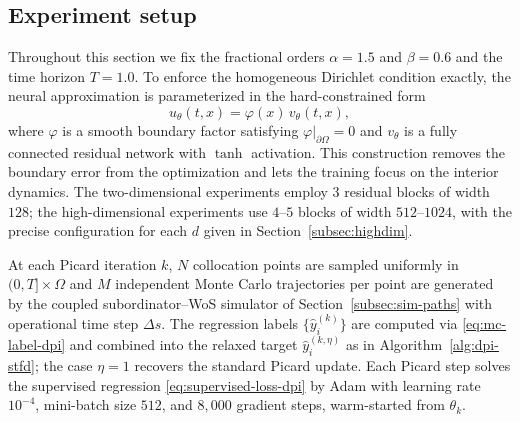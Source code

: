 \documentclass[a4paper,fleqn]{cas-sc}
\begin{document}
\subsection{Experiment setup}\label{subsec:setup}

Throughout this section we fix the fractional orders $\alpha=1.5$ and $\beta=0.6$
and the time horizon $T=1.0$. To enforce the homogeneous Dirichlet condition
exactly, the neural approximation is parameterized in the hard-constrained
form
\begin{equation}\label{eq:hard-constraint}
u_\theta(t,x)=\varphi(x)\,v_\theta(t,x),
\end{equation}
where $\varphi$ is a smooth boundary factor satisfying $\varphi|_{\partial\Omega}=0$
and $v_\theta$ is a fully connected residual network with $\tanh$ activation.
This construction removes the boundary error from the optimization and lets the
training focus on the interior dynamics. The two-dimensional experiments
employ $3$ residual blocks of width $128$; the high-dimensional experiments
use $4$--$5$ blocks of width $512$--$1024$, with the precise configuration for
each $d$ given in Section~\ref{subsec:highdim}.

At each Picard iteration $k$, $N$ collocation points are sampled uniformly in
$(0,T]\times\Omega$ and $M$ independent Monte Carlo trajectories per point are
generated by the coupled subordinator--WoS simulator of
Section~\ref{subsec:sim-paths} with operational time step $\Delta s$. The
regression labels $\{\widehat{y}_i^{(k)}\}$ are computed via
\eqref{eq:mc-label-dpi} and combined into the relaxed target
$\widehat{y}_i^{(k,\eta)}$ as in Algorithm~\ref{alg:dpi-stfd}; the case
$\eta=1$ recovers the standard Picard update. Each Picard step solves the
supervised regression \eqref{eq:supervised-loss-dpi} by Adam with learning
rate $10^{-4}$, mini-batch size $512$, and $8{,}000$ gradient steps,
warm-started from $\theta_k$.
\end{document}
